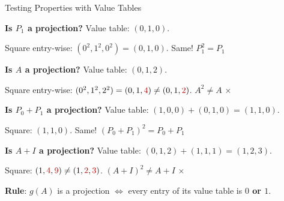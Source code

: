 \documentclass[10pt]{beamer}
\theoremstyle{definition}
\newcommand{\x}[1]{\alert{\textbf{#1}}}
\newcommand{\rd}[1]{{\color{red!70!black}#1}}
\begin{document}
%
%
\begin{frame}{Testing Properties with Value Tables}

\x{Is $P_1$ a projection?} \; Value table: $(0,1,0)$.

Square entry-wise: $(0^2, 1^2, 0^2) = (0,1,0)$. \; Same! \; $P_1^2 = P_1$ \;\checkmark

\vfill\pause

\x{Is $A$ a projection?} \; Value table: $(0,1,2)$.

Square entry-wise: $(0^2, 1^2, 2^2) = (0,1,\rd{4}) \neq (0,1,\rd{2})$. \; $A^2 \neq A$ \;\x{$\boldsymbol\times$}

\vfill\pause

\x{Is $P_0 + P_1$ a projection?} \; Value table: $(1,0,0) + (0,1,0) = (1,1,0)$.

Square: $(1,1,0)$. \; Same! \; $(P_0 + P_1)^2 = P_0 + P_1$ \;\checkmark

\vfill\pause

\x{Is $A + I$ a projection?} \; Value table: $(0,1,2) + (1,1,1) = (1,2,3)$.

Square: $(1, \rd{4}, \rd{9}) \neq (1, \rd{2}, \rd{3})$. \; $(A+I)^2 \neq A+I$ \;\x{$\boldsymbol\times$}

\vfill

\x{Rule}: $g(A)$ is a projection $\iff$ every entry of its value table is \x{$0$ or $1$}.

\end{frame}
\end{document}
